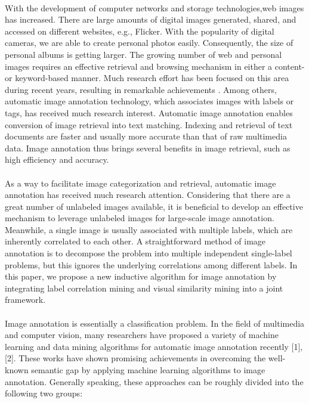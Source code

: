 \documentclass[a4paper,11pt]{report}
\begin{document}
\paragraph{}With the development of computer networks and storage technologies,web images has increased. There are large amounts of digital images generated, shared, and accessed on different websites, e.g., Flicker. With the popularity of digital cameras, we are able to create personal photos easily. Consequently, the size of personal albums is getting larger. The growing number of web and personal images requires an effective retrieval and browsing mechanism in either a content- or keyword-based manner. Much research effort has been focused on this area during recent years, resulting in remarkable achievements . Among others, automatic image annotation technology, which associates images with labels or tags, has received much research interest. Automatic
image annotation enables conversion of image retrieval into text matching. Indexing and retrieval of text documents are faster and usually more accurate than that of raw multimedia data. Image annotation thus brings several benefits in image retrieval, such as high efficiency and accuracy.
\paragraph{} As a way to facilitate image categorization and retrieval, automatic image annotation has received much research attention. Considering that there are a great number of unlabeled images available, it is beneficial to develop an effective mechanism to leverage unlabeled images for large-scale image annotation. Meanwhile, a single image is usually associated with multiple labels, which are inherently correlated to each other. A straightforward method of image annotation is to decompose the problem into multiple independent single-label problems, but this ignores the underlying correlations among different labels. In this paper, we propose a new inductive algorithm for image annotation by integrating label correlation mining and visual similarity mining into a joint framework.  


\paragraph{}Image annotation is essentially a classification problem. In
the field of multimedia and computer vision, many researchers
have proposed a variety of machine learning and data mining
algorithms for automatic image annotation recently [1],[2].
These works have shown promising achievements in overcoming
the well-known semantic gap by applying machine
learning algorithms to image annotation. Generally speaking,
these approaches can be roughly divided into the following two
groups:
\end{document}
